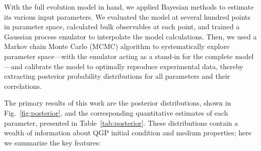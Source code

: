\documentclass[aps,prc,reprint,amsmath,nofootinbib]{revtex4-1}
\begin{document}
With the full evolution model in hand, we applied Bayesian methods to estimate its various input parameters.
We evaluated the model at several hundred points in parameter space, calculated bulk observables at each point, and trained a Gaussian process emulator to interpolate the model calculations.
Then, we used a Markov chain Monte Carlo (MCMC) algorithm to systematically explore parameter space---with the emulator acting as a stand-in for the complete model---and calibrate the model to optimally reproduce experimental data, thereby extracting posterior probability distributions for all parameters and their correlations.

The primary results of this work are the posterior distributions, shown in Fig.~\ref{fig:posterior}, and the
corresponding quantitative estimates of each parameter, presented in Table~\ref{tab:posterior}.
These distributions contain a wealth of information about QGP initial condition and medium properties; here we summarize the key features:
\end{document}
